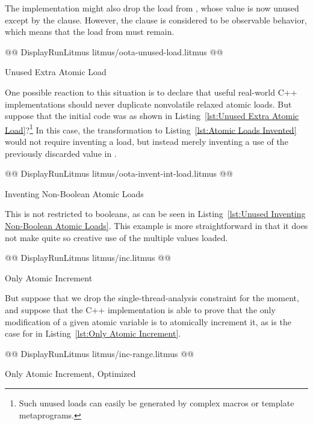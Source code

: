 \documentclass[10]{article}
\begin{document}
The implementation might also drop the load from , whose value
is now unused except by the  clause.
However, the  clause is considered to be observable behavior,
which means that the load from  must remain.

\begin{listing}[tbp]
@@ DisplayRunLitmus litmus/oota-unused-load.litmus @@
\caption{Unused Extra Atomic Load}
\label{lst:Unused Extra Atomic Load}
\end{listing}

One possible reaction to this situation is to declare that useful
real-world C++ implementations should never duplicate nonvolatile
relaxed atomic loads.
But suppose that the initial code was as shown in
Listing~\ref{lst:Unused Extra Atomic Load}?\footnote{
	Such unused loads can easily be generated by complex macros or
	template metaprograms.}
In this case, the transformation to
Listing~\ref{lst:Atomic Loads Invented}
would not require inventing a load, but instead merely inventing a use of
the previously discarded value in .

\begin{listing}[tbp]
@@ DisplayRunLitmus litmus/oota-invent-int-load.litmus @@
\caption{Inventing Non-Boolean Atomic Loads}
\label{lst:Unused Inventing Non-Boolean Atomic Loads}
\end{listing}

This is not restricted to booleans, as can be seen in
Listing~\ref{lst:Unused Inventing Non-Boolean Atomic Loads}.
This example is more straightforward in that it does not make quite so
creative use of the multiple values loaded.

\begin{listing}[tbp]
@@ DisplayRunLitmus litmus/inc.litmus @@
\caption{Only Atomic Increment}
\label{lst:Only Atomic Increment}
\end{listing}

But suppose that we drop the single-thread-analysis constraint for
the moment, and suppose that the C++ implementation is able to prove
that the only modification of a given atomic variable is to atomically
increment it, as is the case for  in
Listing~\ref{lst:Only Atomic Increment}.

\begin{listing}[tbp]
@@ DisplayRunLitmus litmus/inc-range.litmus @@
\caption{Only Atomic Increment, Optimized}
\label{lst:Only Atomic Increment, Optimized}
\end{listing}
\end{document}

